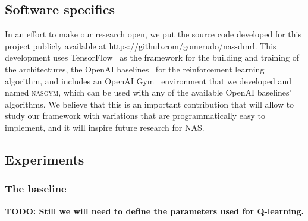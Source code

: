 
\subsection{Software specifics}\label{sec:methodology:software}

In an effort to make our research open, we put the source code developed for this project publicly available at https://github.com/gomerudo/nas-dmrl. This development uses TensorFlow~\citep{tensorflow} as the framework for the building and training of the architectures, the OpenAI baselines~\citep{openaibaselines} for the reinforcement learning algorithm, and includes an OpenAI Gym~\citep{openaigym} environment that we developed and named \textsc{nasgym}, which can be used with any of the available OpenAI baselines' algorithms. We believe that this is an important contribution that will allow to study our framework with variations that are programmatically easy to implement, and it will inspire future research for NAS.

\subsection{Experiments}\label{sec:methodology:experiments}

\subsubsection{The baseline}\label{sec:methodology:experiments:baseline}

\textbf{TODO: Still we will need to define the parameters used for Q-learning.}
